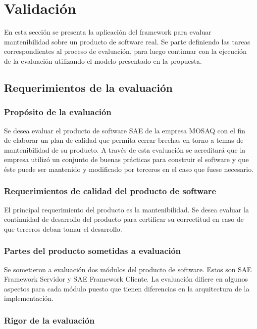 \chapter{Validación}
\label{chap:validacion}
En esta sección se presenta la aplicación del framework para evaluar mantenibilidad
sobre un producto de software real. Se parte definiendo las tareas correspondientes
al proceso de evaluación, para luego continuar con la ejecución de la evaluación
utilizando el modelo presentado en la propuesta.

\section{Requerimientos de la evaluación}

\subsection{Propósito de la evaluación}

Se desea evaluar el producto de software SAE de la empresa MOSAQ con el fin de
elaborar un plan de calidad que permita cerrar brechas en torno a temas de 
mantenibilidad de su producto. A través de esta evaluación se acreditará que la 
empresa utilizó un conjunto de buenas prácticas para construir el software y que 
éste puede ser mantenido y modificado por terceros en el caso que fuese necesario.

\subsection{Requerimientos de calidad del producto de software}

El principal requerimiento del producto es la mantenibilidad. Se desea evaluar
la continuidad de desarrollo del producto para certificar su correctitud
en caso de que terceros deban tomar el desarrollo.

\subsection{Partes del producto sometidas a evaluación}

Se sometieron a evaluación dos módulos del producto de software. Estos son SAE Framework
Servidor y SAE Framework Cliente. La evaluación difiere en algunos aspectos para cada módulo
puesto que tienen diferencias en la arquitectura de la implementación.

\subsection{Rigor de la evaluación}

